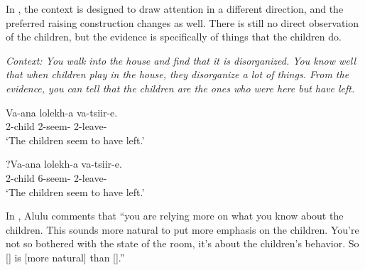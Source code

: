 \documentclass[output=paper,colorlinks,citecolor=brown
]{langscibook}
\begin{document}





\z

In , the context is designed to draw attention in a different direction, and the preferred raising construction changes as well. There is still no direct observation of the children, but the evidence is specifically of things that the children do. 

\ea\label{ex:johnson:AgrVsNonAgr}

\textit{Context: You walk into the house and find that it is disorganized. You know well that when children play in the house, they disorganize a lot of things. From the evidence, you can tell that the children are the ones who were here but have left.}

\begin{xlist}

\ex\label{ex:johnson:AgrRaisingOrganizedHouse}
\gll Va-ana lolekh-a va-tsiir-e.\\
2-child 2\Sm-seem-\Fv{} 2\Sm-leave-\Pst{} \\
\glt `The children seem to have left.'

\ex\label{ex:johnson:NonAgrRaisingOrganizedHouse}
\gll ?Va-ana lolekh-a va-tsiir-e.\\
2-child 6\Sm-seem-\Fv{} 2\Sm-leave-\Pst{} \\
\glt `The children seem to have left.'


\end{xlist}

\z

\noindent In , Alulu comments that ``you are relying more on what you know about the children. This sounds more natural to put more emphasis on the children. You’re not so bothered with the state of the room, it’s about the children’s behavior. So [] is {[more natural]} than [].''
\end{document}
